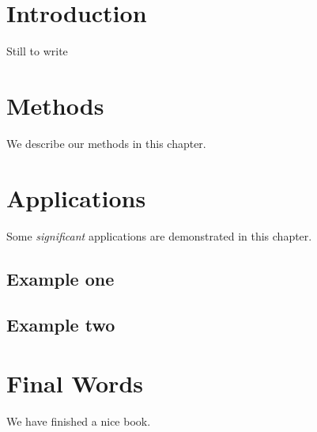 \documentclass[]{book}
\theoremstyle{definition}
\theoremstyle{definition}
\theoremstyle{definition}
\theoremstyle{remark}
\begin{document}

\chapter{Introduction}\label{intro}

Still to write

\chapter{Methods}\label{methods}

We describe our methods in this chapter.

\chapter{Applications}\label{applications}

Some \emph{significant} applications are demonstrated in this chapter.

\section{Example one}\label{example-one}

\section{Example two}\label{example-two}

\chapter{Final Words}\label{final-words}

We have finished a nice book.


\end{document}
